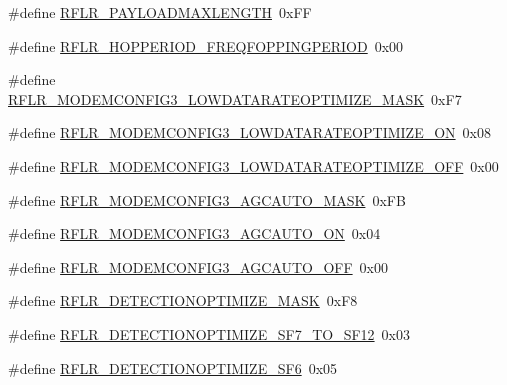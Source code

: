 \begin{DoxyCompactItemize}
\#define \mbox{\hyperlink{sx1276_regs-_lo_ra_8h_ae2ef2578d9d578322e66d92d1a3d2b4f}{R\+F\+L\+R\+\_\+\+P\+A\+Y\+L\+O\+A\+D\+M\+A\+X\+L\+E\+N\+G\+TH}}~0x\+FF
\item 
\#define \mbox{\hyperlink{sx1276_regs-_lo_ra_8h_aedf4649ce9c41869658cdb3a9ea111af}{R\+F\+L\+R\+\_\+\+H\+O\+P\+P\+E\+R\+I\+O\+D\+\_\+\+F\+R\+E\+Q\+F\+O\+P\+P\+I\+N\+G\+P\+E\+R\+I\+OD}}~0x00
\item 
\#define \mbox{\hyperlink{sx1276_regs-_lo_ra_8h_acc0d112fd4a7d3bf0325e1e17701702c}{R\+F\+L\+R\+\_\+\+M\+O\+D\+E\+M\+C\+O\+N\+F\+I\+G3\+\_\+\+L\+O\+W\+D\+A\+T\+A\+R\+A\+T\+E\+O\+P\+T\+I\+M\+I\+Z\+E\+\_\+\+M\+A\+SK}}~0x\+F7
\item 
\#define \mbox{\hyperlink{sx1276_regs-_lo_ra_8h_a1def60d210d6a0ec8ea83f3137db0db3}{R\+F\+L\+R\+\_\+\+M\+O\+D\+E\+M\+C\+O\+N\+F\+I\+G3\+\_\+\+L\+O\+W\+D\+A\+T\+A\+R\+A\+T\+E\+O\+P\+T\+I\+M\+I\+Z\+E\+\_\+\+ON}}~0x08
\item 
\#define \mbox{\hyperlink{sx1276_regs-_lo_ra_8h_aba5ba3dcc0dca5012f459a1328e83e59}{R\+F\+L\+R\+\_\+\+M\+O\+D\+E\+M\+C\+O\+N\+F\+I\+G3\+\_\+\+L\+O\+W\+D\+A\+T\+A\+R\+A\+T\+E\+O\+P\+T\+I\+M\+I\+Z\+E\+\_\+\+O\+FF}}~0x00
\item 
\#define \mbox{\hyperlink{sx1276_regs-_lo_ra_8h_a7436ec112d8acb4c70d2ff02a0e0424c}{R\+F\+L\+R\+\_\+\+M\+O\+D\+E\+M\+C\+O\+N\+F\+I\+G3\+\_\+\+A\+G\+C\+A\+U\+T\+O\+\_\+\+M\+A\+SK}}~0x\+FB
\item 
\#define \mbox{\hyperlink{sx1276_regs-_lo_ra_8h_ac3e41f96acc26c049d2ba14aaf97173a}{R\+F\+L\+R\+\_\+\+M\+O\+D\+E\+M\+C\+O\+N\+F\+I\+G3\+\_\+\+A\+G\+C\+A\+U\+T\+O\+\_\+\+ON}}~0x04
\item 
\#define \mbox{\hyperlink{sx1276_regs-_lo_ra_8h_ab2d2c93d68a0a68d8b6dbdbf49590245}{R\+F\+L\+R\+\_\+\+M\+O\+D\+E\+M\+C\+O\+N\+F\+I\+G3\+\_\+\+A\+G\+C\+A\+U\+T\+O\+\_\+\+O\+FF}}~0x00
\item 
\#define \mbox{\hyperlink{sx1276_regs-_lo_ra_8h_aeb175d9d741f888838066955df3e4edb}{R\+F\+L\+R\+\_\+\+D\+E\+T\+E\+C\+T\+I\+O\+N\+O\+P\+T\+I\+M\+I\+Z\+E\+\_\+\+M\+A\+SK}}~0x\+F8
\item 
\#define \mbox{\hyperlink{sx1276_regs-_lo_ra_8h_ad88e1ef10bcff41afc4074ce1d489320}{R\+F\+L\+R\+\_\+\+D\+E\+T\+E\+C\+T\+I\+O\+N\+O\+P\+T\+I\+M\+I\+Z\+E\+\_\+\+S\+F7\+\_\+\+T\+O\+\_\+\+S\+F12}}~0x03
\item 
\#define \mbox{\hyperlink{sx1276_regs-_lo_ra_8h_aac16a729154e667b90de0819e702433a}{R\+F\+L\+R\+\_\+\+D\+E\+T\+E\+C\+T\+I\+O\+N\+O\+P\+T\+I\+M\+I\+Z\+E\+\_\+\+S\+F6}}~0x05
\item 

\end{DoxyCompactItemize}
